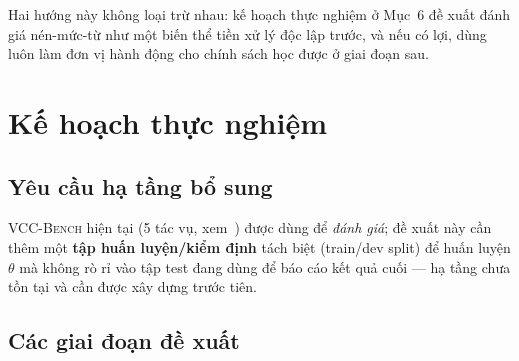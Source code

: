 \documentclass[12pt,a4paper]{article}
\newcommand{\method}[1]{\textsc{#1}}         %
\begin{document}
Hai hướng này không loại trừ nhau: kế hoạch thực nghiệm ở Mục~6 đề xuất đánh giá nén-mức-từ như một biến thể tiền xử lý độc lập trước, và nếu có lợi, dùng luôn làm đơn vị hành động cho chính sách học được ở giai đoạn sau.


\section{Kế hoạch thực nghiệm}

\subsection{Yêu cầu hạ tầng bổ sung}

\method{VCC-Bench} hiện tại (5 tác vụ, xem~\cite{lacc2026}) được dùng để \emph{đánh giá}; đề xuất này cần thêm một \textbf{tập huấn luyện/kiểm định} tách biệt (train/dev split) để huấn luyện $\theta$ mà không rò rỉ vào tập test đang dùng để báo cáo kết quả cuối --- hạ tầng chưa tồn tại và cần được xây dựng trước tiên.

\subsection{Các giai đoạn đề xuất}
\end{document}
